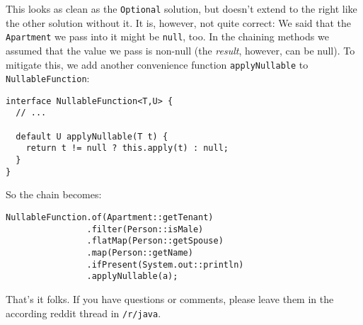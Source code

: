 \documentclass[11pt]{article}
\begin{document}
This looks as clean as the \texttt{Optional} solution, but doesn't extend to the right like the other solution without it. It is, however, not quite correct: We said that the \texttt{Apartment} we pass into it might be \texttt{null}, too. In the chaining methods we assumed that the value we pass is non-null (the \emph{result}, however, can be null). To mitigate this, we add another convenience function \texttt{applyNullable} to \texttt{NullableFunction}:

\begin{verbatim}
interface NullableFunction<T,U> {
  // ...

  default U applyNullable(T t) {
    return t != null ? this.apply(t) : null;
  }
}
\end{verbatim}

So the chain becomes:

\begin{verbatim}
NullableFunction.of(Apartment::getTenant)
                .filter(Person::isMale)
                .flatMap(Person::getSpouse)
                .map(Person::getName)
                .ifPresent(System.out::println)
                .applyNullable(a);
\end{verbatim}

That's it folks. If you have questions or comments, please leave them in the according reddit thread in \texttt{/r/java}.
\end{document}
